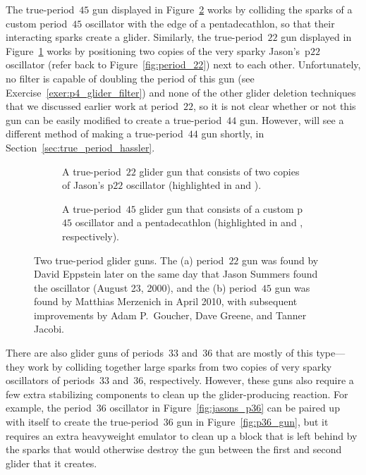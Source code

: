 The true-period~$45$ gun displayed in Figure~\ref{fig:p45_gun} works by colliding the sparks of a custom period~$45$ oscillator with the edge of a pentadecathlon, so that their interacting sparks create a glider. Similarly, the true-period~$22$ gun displayed in Figure~\ref{fig:p22_glider_gun} works by positioning two copies of the very sparky Jason's~p$22$ oscillator (refer back to Figure~\ref{fig:period_22}) next to each other. Unfortunately, no filter is capable of doubling the period of this gun (see Exercise~\ref{exer:p4_glider_filter}) and none of the other glider deletion techniques that we discussed earlier work at period~$22$, so it is not clear whether or not this gun can be easily modified to create a true-period~$44$ gun. However, will see a different method of making a true-period~$44$ gun shortly, in Section~\ref{sec:true_period_hassler}.

\begin{figure}[!htb]
	\centering
	\begin{subfigure}{0.50\textwidth}
		\centering
		\caption{A true-period~$22$ glider gun that consists of two copies of Jason's p$22$ oscillator (highlighted in  and ).}\label{fig:p22_glider_gun}
	\end{subfigure} \hfill \begin{subfigure}{0.46\textwidth}
		\centering
		\caption{A true-period~$45$ glider gun that consists of a custom p$45$ oscillator and a pentadecathlon (highlighted in  and , respectively).}\label{fig:p45_gun}
	\end{subfigure}
	\caption{Two true-period glider guns. The (a) period~$22$ gun was found by David Eppstein later on the same day that Jason Summers found the oscillator (August 23, 2000), and the (b) period~$45$ gun was found by Matthias Merzenich in April 2010, with subsequent improvements by  Adam P.~Goucher, Dave Greene, and Tanner Jacobi.}\label{fig:p22_45_guns}
\end{figure}

There are also glider guns of periods~$33$ and~$36$ that are mostly of this type---they work by colliding together large sparks from two copies of very sparky oscillators of periods~$33$ and~$36$, respectively. However, these guns also require a few extra stabilizing components to clean up the glider-producing reaction. For example, the period~$36$ oscillator in Figure~\ref{fig:jasons_p36} can be paired up with itself to create the true-period~$36$ gun in Figure~\ref{fig:p36_gun}, but it requires an extra heavyweight emulator to clean up a block that is left behind by the sparks that would otherwise destroy the gun between the first and second glider that it creates.


